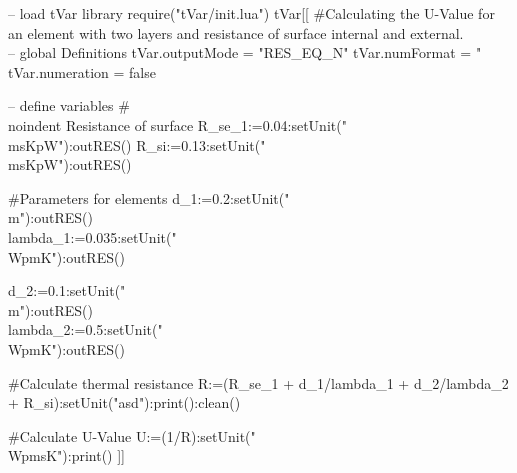 \documentclass{article}
\newcommand{\msKpW}{\tfrac{m^2K}{W}}
\newcommand{\WpmsK}{\tfrac{W}{m^2K}}
\newcommand{\WpmK}{\tfrac{W}{mK}}
\newcommand{\m}{m}
\begin{document}
\begin{luacode}
	-- load tVar library
	require("tVar/init.lua")
tVar[[
	#Calculating the U-Value for an element with two layers and resistance of surface internal and external.\\

	-- global Definitions
	tVar.outputMode = "RES_EQ_N"
	tVar.numFormat = "%
	tVar.numeration = false
		
	-- define variables
	#\\noindent Resistance of surface
	R_se_1:=0.04:setUnit("\\msKpW"):outRES()
	R_si:=0.13:setUnit("\\msKpW"):outRES()
	
	#Parameters for elements
	d_1:=0.2:setUnit("\\m"):outRES()
	\\lambda_1:=0.035:setUnit("\\WpmK"):outRES()
	
	d_2:=0.1:setUnit("\\m"):outRES()
	\\lambda_2:=0.5:setUnit("\\WpmK"):outRES()
	
	#Calculate thermal resistance
	R:=(R_se_1 + d_1/lambda_1 + d_2/lambda_2 + R_si):setUnit("asd"):print():clean()
	
	#Calculate U-Value
	U:=(1/R):setUnit("\\WpmsK"):print()
]]
\end{luacode}
\end{document}
